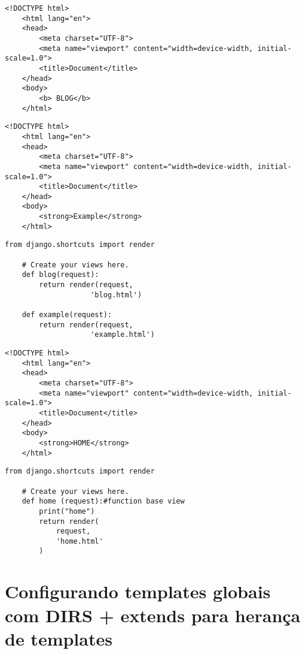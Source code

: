 \documentclass{article}
\begin{document}
\begin{lstlisting}[style=djangohtml, caption={blog/templates/blog/blog.html}]
    <!DOCTYPE html>
    <html lang="en">
    <head>
        <meta charset="UTF-8">
        <meta name="viewport" content="width=device-width, initial-scale=1.0">
        <title>Document</title>
    </head>
    <body>
        <b> BLOG</b>
    </html>
\end{lstlisting}


\begin{lstlisting}[style= djangohtml, caption={blog/templates/blog/example.html}]
    <!DOCTYPE html>
    <html lang="en">
    <head>
        <meta charset="UTF-8">
        <meta name="viewport" content="width=device-width, initial-scale=1.0">
        <title>Document</title>
    </head>
    <body>
        <strong>Example</strong>
    </html>

\end{lstlisting}

\begin{lstlisting}[style=pythonStyle, caption={blog/views.py}]
    from django.shortcuts import render

    # Create your views here.
    def blog(request):
        return render(request,
                    'blog.html')

    def example(request):
        return render(request, 
                    'example.html')

\end{lstlisting}


\begin{lstlisting}[style=djangohtml, caption={home/templates/home/home.html}]
    <!DOCTYPE html>
    <html lang="en">
    <head>
        <meta charset="UTF-8">
        <meta name="viewport" content="width=device-width, initial-scale=1.0">
        <title>Document</title>
    </head>
    <body>
        <strong>HOME</strong>
    </html>
\end{lstlisting}


\begin{lstlisting}[style=pythonStyle, caption={home/views.py}]
    from django.shortcuts import render

    # Create your views here.
    def home (request):#function base view
        print("home")
        return render(
            request,
            'home.html'
        )

\end{lstlisting}

\section{Configurando templates globais com DIRS + extends para herança de templates}
\end{document}
